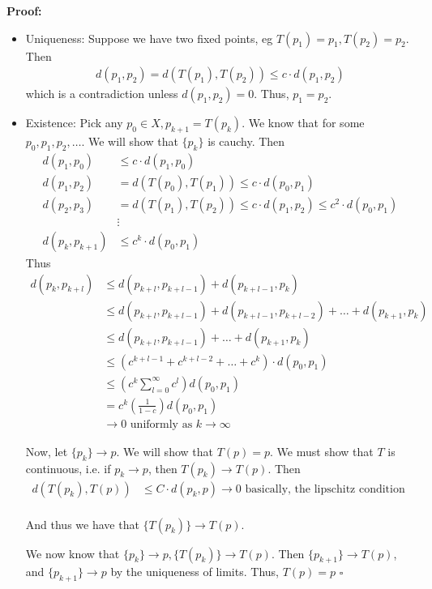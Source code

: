 \documentclass{article}
\newcommand*{\qed}{\hfill$\square$}%
\newcommand*{\txt}[1]{\text{ #1 }}%
\begin{document}
\textbf{Proof:} \begin{itemize}
    \item Uniqueness: Suppose we have two fixed points, eg $T(p_1)=p_1, T(p_2)=p_2$. Then \begin{align*}
        d(p_1,p_2)=d(T(p_1),T(p_2))\leq c\cdot d(p_1,p_2)
    \end{align*} which is a contradiction unless $d(p_1,p_2)=0$. Thus, $p_1=p_2$.
    \item Existence: Pick any $p_0\in X, p_{k+1}=T(p_k)$. We know that for some $p_0,p_1,p_2,\dots$. We will show that $\{p_k\}$ is cauchy. Then \begin{align*}
        d(p_1,p_0)&\leq c\cdot d(p_1,p_0)\\
        d(p_1,p_2)&=d(T(p_0),T(p_1))\leq c\cdot d(p_0,p_1)\\
        d(p_2,p_3)&=d(T(p_1),T(p_2))\leq c\cdot d(p_1,p_2)\leq c^2\cdot d(p_0,p_1)\\
        &\vdots\\
        d(p_{k},p_{k+1})&\leq c^k\cdot d(p_0,p_1)
    \end{align*}
    Thus \begin{align*}
        d(p_{k},p_{k+l})&\leq d(p_{k+l},p_{k+l-1})+d(p_{k+l-1},p_k)\\
        &\leq d(p_{k+l},p_{k+l-1})+d(p_{k+l-1},p_{k+l-2})+\dots+d(p_{k+1},p_k)\\
        &\leq d(p_{k+l},p_{k+l-1})+\dots+d(p_{k+1},p_k)\\
        &\leq (c^{k+l-1}+c^{k+l-2}+\dots+c^{k})\cdot d(p_0,p_1)\\
        &\leq (c^k\sum_{l=0}^{\infty}c^l)d(p_0,p_1)\\
        &=c^k(\frac{1}{1-c})d(p_0,p_1)\\
        &\to 0\txt{uniformly as}k\to\infty
    \end{align*} 

    Now, let $\{p_k\}\to p$. We will show that $T(p)=p$. We must show that $T$ is continuous, i.e. if $p_k\to p$, then $T(p_k)\to T(p)$. Then \begin{align*}
        d(T(p_k),T(p))&\leq C\cdot d(p_k,p)\to 0\txt{basically, the lipschitz condition}\\
    \end{align*}

    And thus we have that $\{T(p_k)\}\to T(p)$. 

    We now know that $\{p_k\}\to p, \{T(p_k)\}\to T(p)$. Then $\{p_{k+1}\}\to T(p)$, and $\{p_{k+1}\}\to p$ by the uniqueness of limits. Thus, $T(p)=p$ \qed
\end{itemize}
\end{document}
